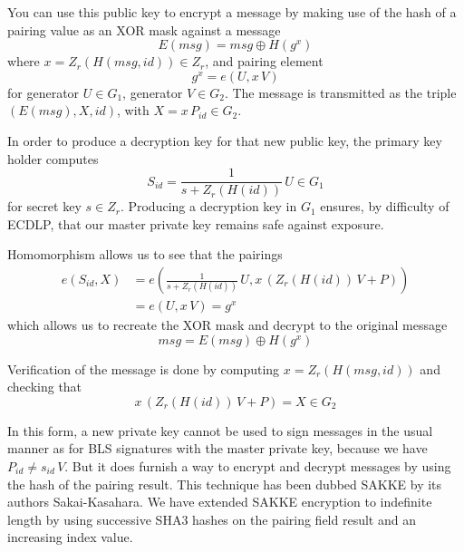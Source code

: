 \documentclass{yellowpaper}
\begin{document}
You can use this public key to encrypt a message by making use of the hash of a pairing value as an XOR mask against a message $$E(msg) = msg \oplus H(g^x)$$ where $x = Z_r(H(msg, id)) \in Z_r$, and pairing element 
$$g^x = e(U, x \, V)$$
for generator $U \in G_1$, generator $V \in G_2$. The message is transmitted as the triple $(E(msg), X, id)$, with $X = x \, P_{id} \in G_2$.

In order to produce a decryption key for that new public key, the primary key holder computes $$S_{id} = \frac{1}{s + Z_r(H(id))} \, U \in G_1$$ for secret key $s \in Z_r$. Producing a decryption key in $G_1$ ensures, by difficulty of ECDLP, that our master private key remains safe against exposure.

Homomorphism allows us to see that the pairings 
$$
\begin{align}
    e(S_{id}, X) &= e(\frac{1}{s + Z_r(H(id))}\, U, x\,(Z_r(H(id)) \, V + P)) \\
    &= e(U, x\, V) = g^x
\end{align}$$ 
which allows us to recreate the XOR mask and decrypt to the original message 
$$msg = E(msg) \oplus H(g^x)$$ 

Verification of the message is done by computing $x = Z_r(H(msg, id))$ and checking that 
$$x\, (Z_r(H(id))\, V + P) = X \in G_2$$

In this form, a new private key cannot be used to sign messages in the usual manner as for BLS signatures with the master private key, because we have $P_{id} \neq s_{id} \, V$. But it does furnish a way to encrypt and decrypt messages by using the hash of the pairing result. This technique has been dubbed SAKKE by its authors Sakai-Kasahara\cite{sakke}. We have extended SAKKE encryption to indefinite length by using successive SHA3 hashes on the pairing field result and an increasing index value.

\balance


%   
\end{document}
